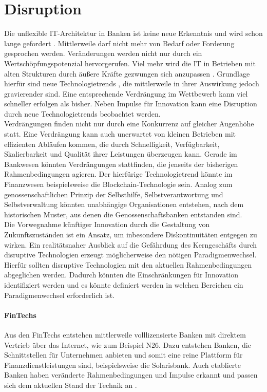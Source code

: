 \section{Disruption}
Die unflexible IT-Architektur in Banken ist keine neue Erkenntnis und wird schon lange gefordert \cite{Brockhoff2006, Bussmann2006}. Mittlerweile darf nicht mehr von Bedarf oder Forderung gesprochen werden. Veränderungen werden nicht nur durch ein Wertschöpfungspotenzial hervorgerufen. Viel mehr wird die IT in Betrieben mit alten Strukturen durch äußere Kräfte gezwungen sich anzupassen \cite{Alt2017, Gupta:2017}. Grundlage hierfür sind neue Technologietrends \cite{Bussmann2006}, die mittlerweile in ihrer Auswirkung jedoch gravierender sind. Eine entsprechende Verdrängung im Wettbewerb kann viel schneller erfolgen als bisher. Neben Impulse für Innovation kann eine Disruption durch neue Technologietrends beobachtet werden.
\medskip
\\
Verdrängungen finden nicht nur durch eine Konkurrenz auf gleicher Augenhöhe statt. Eine Verdrängung kann auch unerwartet von kleinen Betrieben mit effizienten Abläufen kommen, die durch Schnelligkeit, Verfügbarkeit, Skalierbarkeit und Qualität ihrer Leistungen überzeugen kann.  Gerade im Bankwesen könnten Verdrängungen stattfinden, die jenseits der bisherigen Rahmenbedingungen agieren. Der hierfürige Technologietrend könnte im Finanzwesen beispielsweise die Blockchain-Technologie sein. Analog zum genossenschaftlichen Prinzip der Selbsthilfe, Selbstverantwortung und Selbstverwaltung könnten unabhängige Organisationen entstehen, nach dem historischen Muster, aus denen die Genossenschaftsbanken entstanden sind.
\medskip
\\
Die Vorwegnahme künftiger Innovation durch die Gestaltung von Zukunftszuständen \cite{Alt2017} ist ein Ansatz, um inbesondere Diskontinuitäten entgegen zu wirken. Ein realitätsnaher Ausblick auf die Gefährdung des Kerngeschäfts durch disruptive Technologien erzeugt möglicherweise den nötigen Paradigmenwechsel.
Hierfür sollten disruptive Technologien mit den aktuellen Rahmenbedingungen abgeglichen werden. Dadurch könnten die Einschränkungen für Innovation identifiziert werden und es könnte definiert werden in welchen Bereichen ein Paradigmenwechsel erforderlich ist.

\paragraph{FinTechs}
\label{Disruption:FinTechs}
Aus den FinTechs entstehen mittlerweile volllizensierte Banken mit direktem Vertrieb über das Internet, wie zum Beispiel N26. Dazu entstehen Banken, die Schnittstellen für Unternehmen anbieten und somit eine reine Plattform für Finanzdienstleistungen sind, beispielsweise die Solarisbank. Auch etablierte Banken haben veränderte Rahmenbedingungen und Impulse erkannt und passen sich dem aktuellen Stand der Technik an \cite{Gupta:2017, Eismann2015}.

